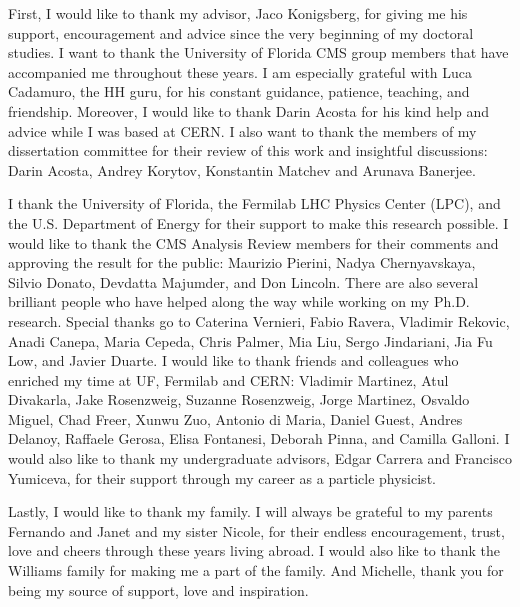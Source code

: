 
First, I would like to thank my advisor, Jaco Konigsberg, for giving me his support, encouragement and advice since the very beginning of my doctoral studies. I want to thank the University of Florida CMS group members that have accompanied me throughout these years. I am especially grateful with Luca Cadamuro, the HH guru, for his constant guidance, patience, teaching, and friendship. Moreover, I would like to thank Darin Acosta for his kind help and advice while I was based at CERN. I also want to thank the members of my dissertation committee for their review of this work and insightful discussions: Darin Acosta, Andrey Korytov, Konstantin Matchev and Arunava Banerjee. 

I thank the University of Florida, the Fermilab LHC Physics Center (LPC), and the U.S. Department of Energy for their support to make this research possible. I would like to thank the CMS Analysis Review members for their comments and approving the result for the public: Maurizio Pierini, Nadya Chernyavskaya, Silvio Donato, Devdatta Majumder, and Don Lincoln. There are also several brilliant people who have helped along the way while working on my Ph.D. research. Special thanks go to Caterina Vernieri, Fabio Ravera, Vladimir Rekovic, Anadi Canepa, Maria Cepeda, Chris Palmer, Mia Liu, Sergo Jindariani, Jia Fu Low, and Javier Duarte. I would like to thank friends and colleagues who enriched my time at UF, Fermilab and CERN: Vladimir Martinez, Atul Divakarla, Jake Rosenzweig, Suzanne Rosenzweig, Jorge Martinez, Osvaldo Miguel, Chad Freer, Xunwu Zuo, Antonio di Maria, Daniel Guest, Andres Delanoy, Raffaele Gerosa, Elisa Fontanesi, Deborah Pinna, and Camilla Galloni. I would also like to thank my undergraduate advisors, Edgar Carrera and Francisco Yumiceva, for their support through my career as a particle physicist.

Lastly, I would like to thank my family. I will always be grateful to my parents Fernando and Janet and my sister Nicole, for their endless encouragement, trust, love and cheers through these years living abroad. I would also like to thank the Williams family for making me a part of the family. And Michelle, thank you for being my source of support, love and inspiration.